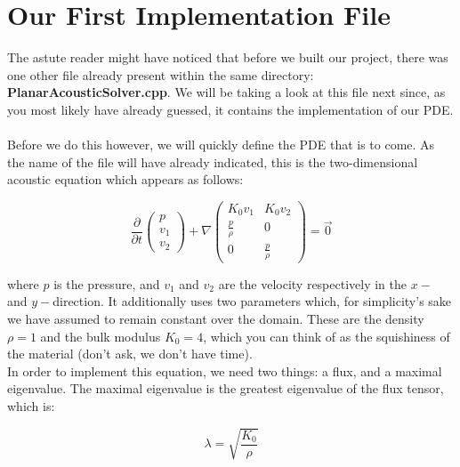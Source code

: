 \documentclass[12pt,letterpaper]{article}
\begin{document}
\newpage

\section{Our First Implementation File}
The astute reader might have noticed that before we built our project, there was one other file already present within the same directory: \textbf{PlanarAcousticSolver.cpp}.
We will be taking a look at this file next since, as you most likely have already guessed, it contains the implementation of our PDE.
\\ \\
Before we do this however, we will quickly define the PDE that is to come. As the name of the file will have already indicated,
this is the two-dimensional acoustic equation which appears as follows:

\begin{equation*} \label{Acoustic_equation}
    \frac{\partial}{\partial t}\left(
    \begin{array}{lr} p \\
                      v_1 \\
                      v_2
                      \end{array} \right) +
    \nabla \begin{pmatrix}
                      K_0 v_1          & K_0 v_2\\
                      \frac{p}{\rho}   & 0 \\
                      0                & \frac{p}{\rho}
    \end{pmatrix}  = \vec{0}
\end{equation*}

where $p$ is the pressure, and $v_1$ and $v_2$ are the velocity respectively in the $x-$ and $y-$direction.
It additionally uses two parameters which, for simplicity's sake we have assumed to remain constant over the domain.
These are the density $\rho=1$ and the bulk modulus $K_0=4$, which you can think of as the squishiness of the material (don't ask, we don't have time).\\
In order to implement this equation, we need two things: a flux, and a maximal eigenvalue.
The maximal eigenvalue is the greatest eigenvalue of the flux tensor, which is:

\begin{equation*} \label{Acoustic_eigenvalue}
    \lambda = \sqrt{\frac{K_0}{\rho}}
\end{equation*}
\end{document}
